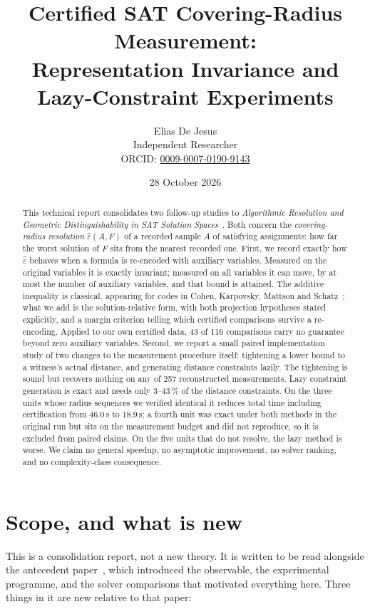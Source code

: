\documentclass[11pt,a4paper]{article}
\title{Certified SAT Covering-Radius Measurement:\\
Representation Invariance and Lazy-Constraint Experiments}
\author{Elias De Jesus\\[2pt]
\small Independent Researcher\\
\small ORCID: \href{https://orcid.org/0009-0007-0190-9143}{0009-0007-0190-9143}}
\date{28 October 2026}
\theoremstyle{plain}
\theoremstyle{definition}
\theoremstyle{remark}
\newcommand{\epshat}{\hat{\varepsilon}}
\begin{document}
\maketitle

\begin{abstract}
This technical report consolidates two follow-up studies to
\emph{Algorithmic Resolution and Geometric Distinguishability in SAT Solution
Spaces}~\cite{dejesus2026sat}. Both concern the \emph{covering-radius
resolution} $\epshat(A,F)$ of a recorded sample $A$ of satisfying assignments:
how far the worst solution of $F$ sits from the nearest recorded one. First, we
record exactly how $\epshat$ behaves when a formula is re-encoded with auxiliary
variables. Measured on the original variables it is exactly invariant; measured
on all variables it can move, by at most the number of auxiliary variables, and
that bound is attained. The additive inequality is classical, appearing for
codes in Cohen, Karpovsky, Mattson and Schatz~\cite{cohen1985covering}; what we
add is the solution-relative form, with both projection hypotheses stated
explicitly, and a margin criterion telling which certified comparisons survive a
re-encoding. Applied to our own certified data, 43 of 116 comparisons carry no
guarantee beyond zero auxiliary variables. Second, we report a small paired
implementation study of two changes to the measurement procedure itself:
tightening a lower bound to a witness's actual distance, and generating distance
constraints lazily. The tightening is sound but recovers nothing on any of 257
reconstructed measurements. Lazy constraint generation is exact and needs only
3--43\,\% of the distance constraints. On the three units whose radius
sequences we verified identical it reduces total time including certification
from $46.0$\,s to $18.9$\,s; a fourth unit was exact under both methods in the
original run but sits on the measurement budget and did not reproduce, so it is
excluded from paired claims. On the five units that do not resolve, the lazy
method is worse. We claim no
general speedup, no asymptotic improvement, no solver ranking, and no
complexity-class consequence.
\end{abstract}

\section{Scope, and what is new}

This is a consolidation report, not a new theory. It is written to be read
alongside the antecedent paper~\cite{dejesus2026sat}, which introduced the
observable, the experimental programme, and the solver comparisons that
motivated everything here. Three things in it are new relative to that paper:
\end{document}
